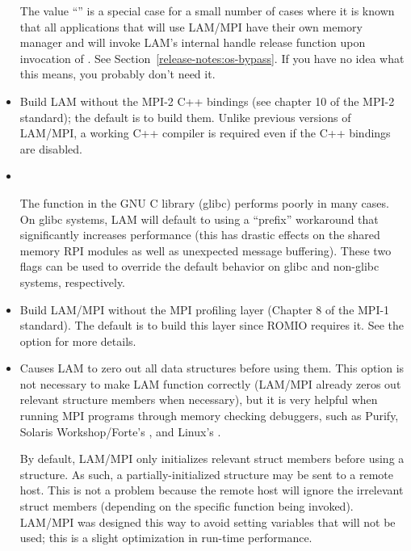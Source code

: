 \begin{itemize}
  The value ``'' is a special case for a small
  number of cases where it is known that all applications that will
  use LAM/MPI have their own memory manager and will invoke LAM's
  internal handle release function upon invocation of .
  See Section~\ref{release-notes:os-bypass}.  If you have no idea what
  this means, you probably don't need it.


\item {}

  Build LAM without the MPI-2 C++ bindings (see chapter 10 of the
  MPI-2 standard); the default is to build them.  Unlike previous
  versions of LAM/MPI, a working C++ compiler is required even if the
  C++ bindings are disabled.


\item {} \\
  
  The  function in the GNU C library (glibc) performs
  poorly in many cases.  On glibc systems, LAM will default to using a
  ``prefix''  workaround that significantly increases
   performance (this has drastic effects on the shared
  memory RPI modules as well as unexpected message buffering).  These
  two flags can be used to override the default behavior on glibc and
  non-glibc systems, respectively.


\item {}
  
  Build LAM/MPI without the MPI profiling layer (Chapter 8 of the
  MPI-1 standard).  The default is to build this layer since ROMIO
  requires it.  See the  option for more
  details.


\item {}
  
  Causes LAM to zero out all data structures before using them.  This
  option is not necessary to make LAM function correctly (LAM/MPI
  already zeros out relevant structure members when necessary), but it
  is very helpful when running MPI programs through memory checking
  debuggers, such as Purify, Solaris Workshop/Forte's ,
  and Linux's .
  
  By default, LAM/MPI only initializes relevant struct members before
  using a structure.  As such, a partially-initialized structure may
  be sent to a remote host.  This is not a problem because the remote
  host will ignore the irrelevant struct members (depending on the
  specific function being invoked).  LAM/MPI was designed this way to
  avoid setting variables that will not be used; this is a slight
  optimization in run-time performance.
  

\end{itemize}
